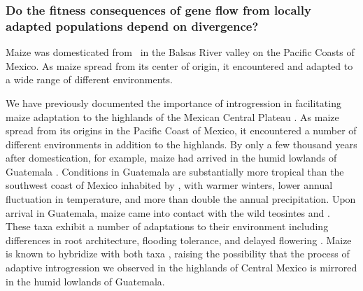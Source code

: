 \subsubsection{Do the fitness consequences of gene flow from locally adapted populations depend on divergence?}
\label{sss:adaptive_intro}



Maize was domesticated from \zp\ in the Balsas River valley on the Pacific Coasts of Mexico.  
As maize spread from its center of origin, it encountered and adapted to a wide range of different environments.

We have previously documented the importance of introgression in facilitating maize adaptation to the highlands of the Mexican Central Plateau \citep{Hufford2013, Takuno15062015}.
As maize spread from its origins in the Pacific Coast of Mexico, it  encountered a number of different environments in addition to the highlands.
By only a few thousand years after domestication, for example, maize had arrived in the humid lowlands of Guatemala \citep{neff2006early}.  
Conditions in Guatemala are substantially more tropical than the southwest coast of Mexico inhabited by \zp, with warmer winters, lower annual fluctuation in temperature, and more than double the annual precipitation.
Upon arrival in Guatemala, maize came into contact with the wild teosintes \zh{} and \zl.  
These taxa exhibit a number of adaptations to their environment including differences in root architecture, flooding tolerance, and delayed flowering \citep{wilkes1967teosinte, mano2006}.
Maize is known to hybridize with both taxa \citep{wilkes1967teosinte}, raising the possibility that the process of adaptive introgression we observed in the highlands of Central Mexico is mirrored in the humid lowlands of Guatemala.


